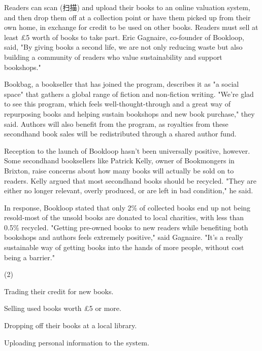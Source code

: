 \documentclass{英语试卷}
\begin{document}
\par Readers can scan (扫描) and upload their books to an online valuation system, and then drop them off at a collection point or have them picked up from their own home, in exchange for credit to be used on other books. Readers must sell at least £5 worth of books to take part. Eric Gagnaire, co-founder of Bookloop, said, "By giving books a second life, we are not only reducing waste but also building a community of readers who value sustainability and support bookshops."\par
\par Bookbag, a bookseller that has joined the program, describes it as "a social space" that gathers a global range of fiction and non-fiction writing. "We're glad to see this program, which feels well-thought-through and a great way of repurposing books and helping sustain bookshops and new book purchase," they said. Authors will also benefit from the program, as royalties from these secondhand book sales will be redistributed through a shared author fund.\par
\par Reception to the launch of Bookloop hasn't been universally positive, however. Some secondhand booksellers like Patrick Kelly, owner of Bookmongers in Brixton, raise concerns about how many books will actually be sold on to readers. Kelly argued that most secondhand books should be recycled. "They are either no longer relevant, overly produced, or are left in bad condition," he said.\par
\par In response, Bookloop stated that only 2\% of collected books end up not being resold-most of the unsold books are donated to local charities, with less than 0.5\% recycled. "Getting pre-owned books to new readers while benefiting both bookshops and authors feels extremely positive," said Gagnaire. "It's a really sustainable way of getting books into the hands of more people, without cost being a barrier."\par
{}
\begin{choices}(2)
  \item Trading their credit for new books.
  \item Selling used books worth £5 or more.
  \item Dropping off their books at a local library.
  \item Uploading personal information to the system.
\end{choices}
\end{document}
